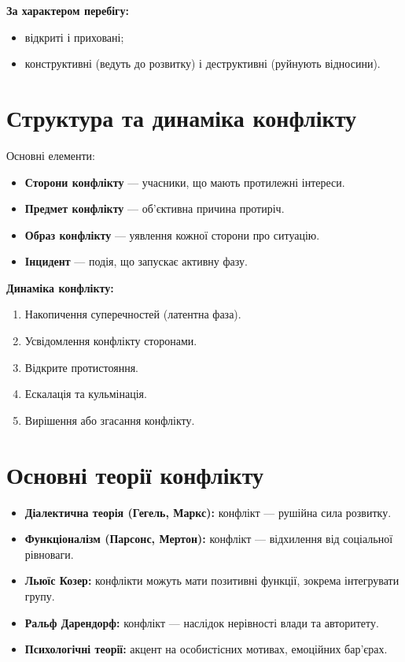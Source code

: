 \documentclass[12pt,a4paper]{article}
\begin{document}
    \textbf{За характером перебігу:}
    \begin{itemize}
        \item відкриті і приховані;
        \item конструктивні (ведуть до розвитку) і деструктивні (руйнують відносини).
    \end{itemize}

    \section*{Структура та динаміка конфлікту}
    Основні елементи:
    \begin{itemize}
        \item \textbf{Сторони конфлікту} — учасники, що мають протилежні інтереси.
        \item \textbf{Предмет конфлікту} — об’єктивна причина протиріч.
        \item \textbf{Образ конфлікту} — уявлення кожної сторони про ситуацію.
        \item \textbf{Інцидент} — подія, що запускає активну фазу.
    \end{itemize}

    \textbf{Динаміка конфлікту:}
    \begin{enumerate}
        \item Накопичення суперечностей (латентна фаза).
        \item Усвідомлення конфлікту сторонами.
        \item Відкрите протистояння.
        \item Ескалація та кульмінація.
        \item Вирішення або згасання конфлікту.
    \end{enumerate}

    \section*{Основні теорії конфлікту}
    \begin{itemize}
        \item \textbf{Діалектична теорія (Гегель, Маркс):} конфлікт — рушійна сила розвитку.
        \item \textbf{Функціоналізм (Парсонс, Мертон):} конфлікт — відхилення від соціальної рівноваги.
        \item \textbf{Льюїс Козер:} конфлікти можуть мати позитивні функції, зокрема інтегрувати групу.
        \item \textbf{Ральф Дарендорф:} конфлікт — наслідок нерівності влади та авторитету.
        \item \textbf{Психологічні теорії:} акцент на особистісних мотивах, емоційних бар’єрах.
    \end{itemize}
\end{document}
